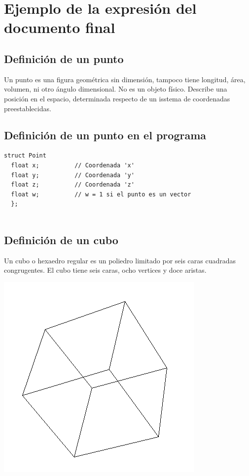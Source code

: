 \documentclass{article}
\begin{document}
\newpage
\section{Ejemplo de la expresión del documento final}
\subsection{Definición de un punto}
Un punto es una figura geométrica sin dimensión, tampoco tiene longitud, área, volumen, ni otro ángulo dimensional. No es un objeto físico. Describe una posición en el espacio, determinada respecto de un isstema de coordenadas preestablecidas.
\subsection{Definición de un punto en el programa}
\begin{lstlisting}[frame=single]
  struct Point 
  float x;          // Coordenada 'x'
  float y;          // Coordenada 'y'
  float z;          // Coordenada 'z'
  float w;          // w = 1 si el punto es un vector
  };
  
\end{lstlisting}

\subsection{Definición de un cubo}
Un cubo o hexaedro regular es un poliedro limitado por seis caras cuadradas congrugentes. El cubo tiene seis caras, ocho vertices y doce aristas.
\begin{center}
  \includegraphics[scale=0.5]{img/cube.png}
\end{center}
\end{document}
